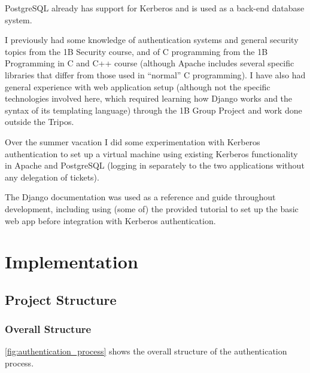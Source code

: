 \documentclass[12pt]{report}
\begin{document}
PostgreSQL already has support for Kerberos and is used as a back-end database system.

I previously had some knowledge of authentication systems and general security topics from the 1B Security course, and of C programming from the 1B Programming in C and C++ course (although Apache includes several specific libraries that differ from those used in ``normal'' C programming\cite{Apache-book}). I have also had general experience with web application setup (although not the specific technologies involved here, which required learning how Django works and the syntax of its templating language) through the 1B Group Project and work done outside the Tripos.

Over the summer vacation I did some experimentation with Kerberos authentication to set up a virtual machine using existing Kerberos functionality in Apache and PostgreSQL (logging in separately to the two applications without any delegation of tickets).

The Django documentation\cite{Django-docs} was used as a reference and guide throughout development, including using (some of) the provided tutorial to set up the basic web app before integration with Kerberos authentication.


\chapter{Implementation}

\section{Project Structure}

\subsection{Overall Structure}
\autoref{fig:authentication_process} shows the overall structure of the authentication process.
\end{document}
